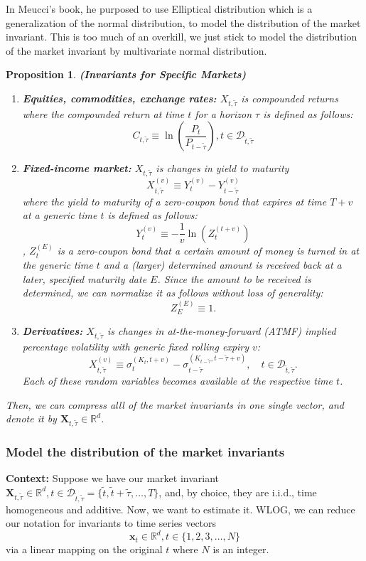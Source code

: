 \documentclass[13pt]{article}
\newtheorem{proposition}[theorem]{Proposition}
\theoremstyle{definition}
\theoremstyle{remark}
\newenvironment{remark}
  {\pushQED{\qed}\renewcommand{\qedsymbol}{$\triangle$}\remarkx}
  {\popQED\endremarkx}
\begin{document}
\begin{remark}
    In Meucci's book, he purposed to use Elliptical distribution which is a generalization of the normal distribution, to model the distribution of the market invariant. This is too much of an overkill, we just stick to model the distribution of the market invariant by multivariate normal distribution.
\end{remark}
\begin{proposition}\label{prop:Invariants for specific markets}
    \textbf{(Invariants for Specific Markets)}
    \begin{enumerate}
        \item \textbf{Equities, commodities, exchange rates:} $X_{t,\tilde{\tau}}$ is compounded returns where 
the compounded return at time $t$ for a horizon $\tau$ is defined as follows:
$$
C_{t, \tilde{\tau}} \equiv \ln \left(\frac{P_t}{P_{t-\tilde{\tau}}}\right), t\in \mathcal{D}_{\tilde{t}, \widetilde{\tau}}
$$
\item \textbf{Fixed-income market:} $X_{t,\tilde{\tau}}$ is changes in yield to maturity $$
X_{t, \widetilde{\tau}}^{(v)} \equiv Y_t^{(v)}-Y_{t-\widetilde{\tau}}^{(v)}
$$
where the yield to maturity of a zero-coupon bond that expires at time $T+v$ at a generic time $t$ is defined as follows:
$$
Y_t^{(v)} \equiv-\frac{1}{v} \ln \left(Z_t^{(t+v)}\right)
$$, $Z_t^{(E)}$ is a zero-coupon bond that a certain amount of money  is turned in at the generic time $t$ and a (larger) determined amount is received back at a later, specified maturity date $E$. Since the amount to be received is determined, we can normalize it as follows without loss of generality:
$$
Z_E^{(E)} \equiv 1.
$$
\item \textbf{Derivatives:} $X_{t,\tilde{\tau}}$ is changes in at-the-money-forward (ATMF) implied percentage volatility with generic fixed rolling expiry $v$:
$$
X_{t, \widetilde{\tau}}^{(v)} \equiv \sigma_t^{\left(K_t, t+v\right)}-\sigma_{t-\tilde{\tau}}^{\left(K_{t-\tilde{\tau}}, t-\tilde{\tau}+v\right)}, \quad t \in \mathcal{D}_{\tilde{t}, \tilde{\tau}} .
$$
Each of these random variables becomes available at the respective time $t$.
    \end{enumerate}
Then, we can compress alll of the market invariants in one single vector, and denote it by $\mathbf{X}_{t, \tilde{\tau}}\in \mathbb{R}^d$.
\end{proposition}

\subsubsection{Model the distribution of the market invariants}
\textbf{Context:} Suppose we have  our market invariant $\mathbf{X}_{t, \tilde{\tau}}\in \mathbb{R}^d, t\in \mathcal{D}_{\tilde{t}, \widetilde{\tau}}=\{\tilde{t}, \widetilde{t}+\widetilde{\tau}, \ldots, T\}$, and, by choice, they are i.i.d., time homogeneous and additive. Now, we want to estimate it. WLOG, we can reduce our notation for invariants to time series vectors $$\mathbf{x}_{t}\in \mathbb{R}^d, t\in \{1,2,3,\ldots, N\}$$ via a linear mapping on the original $t$ where $N$ is an integer. 
\end{document}

